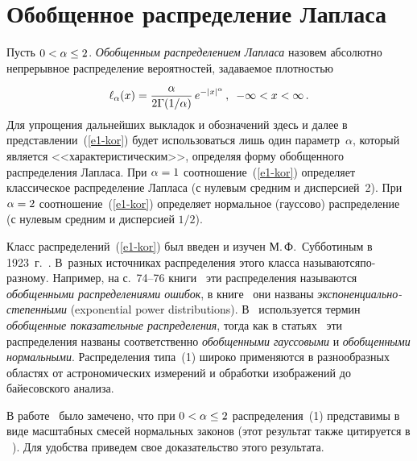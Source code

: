       \begin{multicols}{2}

            \label{st\stat}

\section{Обобщенное распределение Лапласа}

Пусть $0\hm<\alpha\le 2$. {\it Обобщенным распределением Лапласа}
назовем абсолютно непрерывное распределение вероятностей, задаваемое
плот\-ностью
\begin{equation}
\ell_{\alpha}(x)=\displaystyle\frac{\displaystyle \alpha\mathstrut}{\displaystyle 2\Gamma({1}/{\alpha})\mathstrut} \,
e^{-|x|^{\alpha}}\,,\enskip -\infty< x<\infty\,.
\label{e1-kor}
\end{equation}
Для упрощения дальнейших выкладок и обозначений здесь и далее в
представлении~(\ref{e1-kor}) будет использоваться лишь один параметр~$\alpha$,
который является <<характеристическим>>, определяя форму обобщенного
распределения Лапласа. При $\alpha\hm=1$ соотношение~(\ref{e1-kor}) определяет
классическое распределение Лапласа (с нулевым средним и дисперсией~2). 
При $\alpha\hm=2$ соотношение~(\ref{e1-kor}) определяет нормальное (гауссово)
распределение (с нулевым средним и дисперсией $1/2$).

Класс распределений~(\ref{e1-kor}) был введен и изучен М.\,Ф.~Субботиным в
1923~г.~\cite{Subbotin1923}. В~разных источ\-никах распределения этого
класса называются\linebreak по-раз\-но\-му. Например, на с.~74--76 книги~\cite{Evans2000} 
эти распределения называются {\it обобщенными
распределениями ошибок}, в книге~\cite{BoxTiao1973} они названы {\it
экс\-по\-нен\-ци\-аль\-но-сте\-пен\-н$\acute{\mbox{ы}}$ми} (exponential power distributions). 
В~\cite{Morgan1996} используется термин {\it обобщенные показатель\-ные
распределения}, тогда как в статьях~\cite{Varanasi1989, Nadaraja2005} 
эти распределения названы соответственно {\it
обобщенными гауссовыми} и {\it обобщенными нормальными}.
Распределения типа~(1) широко применяются в разнообразных областях
от астрономических измерений и обработки изображений до байесовского
анализа.

В работе~\cite{West1987} было замечено, что при $0\hm<\alpha\hm\le2$
распределения~(1) представимы в виде масштабных смесей
нормальных законов (этот результат также цитируется
в ~\cite{ChoySmith1997}). Для удобства приведем свое до\-ка\-зательство этого
результата.


\end{multicols}
